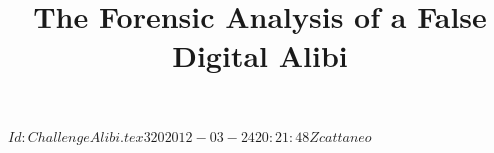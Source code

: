 \documentclass[10pt, conference]{IEEEtran}
\begin{document}

\svnInfo $Id: ChallengeAlibi.tex 320 2012-03-24 20:21:48Z cattaneo $ 




\title{The Forensic Analysis of a False Digital Alibi}




%


\end{document}
